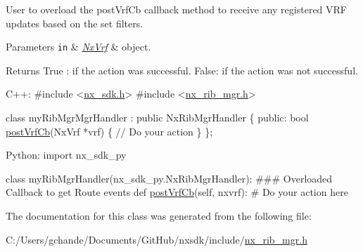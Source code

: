 User to overload the post\+Vrf\+Cb callback method to receive any registered V\+RF updates based on the set filters. 
\begin{DoxyParams}[1]{Parameters}
\mbox{\tt in}  & {\em \mbox{\hyperlink{classnxos_1_1_nx_vrf}{Nx\+Vrf}}} & object.\\
\hline
\end{DoxyParams}
\begin{DoxyReturn}{Returns}
True \+: if the action was successful. False\+: if the action was not successful.
\end{DoxyReturn}

\begin{DoxyCode}
C++:
\textcolor{preprocessor}{   #include <\mbox{\hyperlink{nx__sdk_8h}{nx\_sdk.h}}>}
\textcolor{preprocessor}{   #include <\mbox{\hyperlink{nx__rib__mgr_8h}{nx\_rib\_mgr.h}}>}

   \textcolor{keyword}{class }myRibMgrMgrHandler : \textcolor{keyword}{public} NxRibMgrHandler \{
      \textcolor{keyword}{public}:
         \textcolor{keywordtype}{bool} \mbox{\hyperlink{classnxos_1_1_nx_rib_mgr_handler_a2ed5a3ad9c0e55d21e18d88a19419a5e}{postVrfCb}}(NxVrf *vrf) \{
              \textcolor{comment}{// Do your action}
         \}
   \};

Python:
   \textcolor{keyword}{import} nx\_sdk\_py

   \textcolor{keyword}{class }myRibMgrHandler(nx\_sdk\_py.NxRibMgrHandler):
\textcolor{preprocessor}{   ### Overloaded Callback to get Route events}
         def \mbox{\hyperlink{classnxos_1_1_nx_rib_mgr_handler_a2ed5a3ad9c0e55d21e18d88a19419a5e}{postVrfCb}}(self, nxvrf):
\textcolor{preprocessor}{             # Do your action here}
\end{DoxyCode}
 

The documentation for this class was generated from the following file\+:\begin{DoxyCompactItemize}
\item 
C\+:/\+Users/gchande/\+Documents/\+Git\+Hub/nxsdk/include/\mbox{\hyperlink{nx__rib__mgr_8h}{nx\+\_\+rib\+\_\+mgr.\+h}}\end{DoxyCompactItemize}

